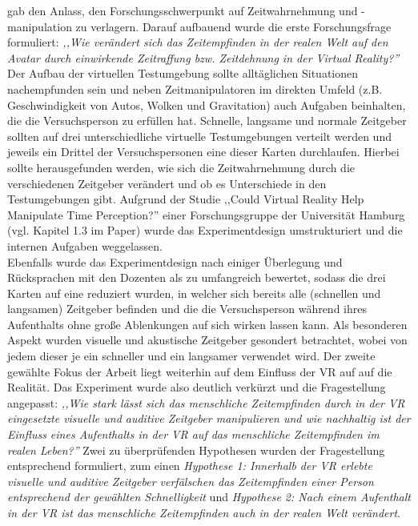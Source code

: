 \documentclass{Bericht}
\begin{document}
gab den Anlass, den Forschungsschwerpunkt auf Zeitwahrnehmung und -manipulation zu verlagern. Darauf aufbauend wurde die erste Forschungsfrage formuliert:
\textit{,,Wie verändert sich das Zeitempfinden in der realen Welt auf den Avatar durch einwirkende Zeitraffung bzw. Zeitdehnung in der Virtual Reality?''}\\
Der Aufbau der virtuellen Testumgebung sollte alltäglichen Situationen nachempfunden sein und neben Zeitmanipulatoren im direkten Umfeld (z.B. Geschwindigkeit von Autos, Wolken und Gravitation) auch Aufgaben beinhalten, die die Versuchsperson zu erfüllen hat. Schnelle, langsame und normale Zeitgeber sollten auf drei unterschiedliche virtuelle Testumgebungen verteilt werden und jeweils ein Drittel der Versuchspersonen eine dieser Karten durchlaufen. Hierbei sollte herausgefunden werden, wie sich die Zeitwahrnehmung durch die verschiedenen Zeitgeber verändert und ob es Unterschiede in den Testumgebungen gibt. Aufgrund der Studie ,,Could Virtual Reality Help Manipulate Time Perception?'' einer Forschungsgruppe der Universität Hamburg (vgl. Kapitel 1.3 im Paper) wurde das Experimentdesign umstrukturiert und die internen Aufgaben weggelassen.\\
Ebenfalls wurde das Experimentdesign nach einiger Überlegung und Rücksprachen mit den Dozenten als zu umfangreich bewertet, sodass die drei Karten auf eine reduziert wurden, in welcher sich bereits alle (schnellen und langsamen) Zeitgeber befinden und die die Versuchsperson während ihres Aufenthalts ohne große Ablenkungen auf sich wirken lassen kann. Als besonderen Aspekt wurden visuelle und akustische Zeitgeber gesondert betrachtet, wobei von jedem dieser je ein schneller und ein langsamer verwendet wird. Der zweite gewählte Fokus der Arbeit liegt weiterhin auf dem Einfluss der VR auf auf die Realität.  
Das Experiment wurde also deutlich verkürzt und die Fragestellung angepasst: \textit{,,Wie stark lässt sich das menschliche
Zeitempfinden durch in der VR eingesetzte visuelle und auditive Zeitgeber manipulieren und
wie nachhaltig ist der Einfluss eines Aufenthalts in der VR auf das menschliche Zeitempfinden
im realen Leben?''} Zwei zu überprüfenden Hypothesen wurden der Fragestellung entsprechend formuliert, zum einen \textit{Hypothese 1: Innerhalb der VR erlebte visuelle und auditive Zeitgeber verfälschen das Zeitempfinden einer Person entsprechend der gewählten Schnelligkeit} und \textit{Hypothese 2: Nach einem
Aufenthalt in der VR ist das menschliche Zeitempfinden auch in der realen Welt verändert}.
 
\end{document}
